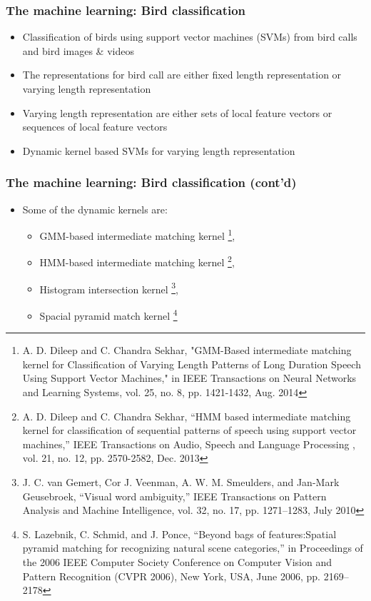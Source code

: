 \documentclass[mathserif]{beamer}
\begin{document}
\begin{frame}
\frametitle{The machine learning: Bird classification}
\begin{itemize}
\item<2-> Classification of birds using support vector machines (SVMs) from bird calls and bird images \& videos
\item<3-> The representations for bird call are either fixed length representation or varying length representation
\item<4-> Varying length representation are either sets of local feature vectors or sequences of local feature vectors
\item<5-> Dynamic kernel based SVMs for varying length representation
\end{itemize}
\end{frame}

\begin{frame}
\frametitle{The machine learning: Bird classification (cont'd)}
\begin{itemize}
\item<2-> Some of the dynamic kernels are:
\begin{itemize}
	\item GMM-based intermediate matching kernel \footnote{
	A. D. Dileep and C. Chandra Sekhar, "GMM-Based intermediate matching kernel for Classification of Varying Length Patterns of Long Duration Speech Using Support Vector Machines," in IEEE Transactions on Neural Networks and Learning Systems, vol. 25, no. 8, pp. 1421-1432, Aug. 2014},
	\item HMM-based intermediate matching kernel \footnote{A. D. Dileep and C. Chandra Sekhar, “HMM based intermediate matching kernel for classification of sequential patterns of speech using support vector machines,” IEEE Transactions on Audio, Speech and Language Processing , vol. 21, no. 12, pp. 2570-2582, Dec. 2013}, 
	\item Histogram intersection kernel \footnote{J. C. van Gemert, Cor J. Veenman, A. W. M. Smeulders, and Jan-Mark Geusebroek, “Visual word ambiguity,” IEEE Transactions on Pattern Analysis and Machine Intelligence, vol. 32, no. 17, pp. 1271–1283, July 2010}, 
	\item Spacial pyramid match kernel \footnote{S. Lazebnik, C. Schmid, and J. Ponce, “Beyond bags of features:Spatial pyramid matching for recognizing natural scene categories,” in Proceedings of the 2006 IEEE Computer Society Conference on Computer Vision and Pattern Recognition (CVPR 2006), New York, USA, June 2006, pp. 2169–2178}
\end{itemize}
\end{itemize}
\end{frame}
\end{document}
